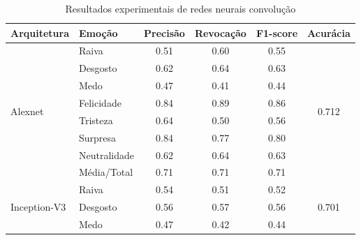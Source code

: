 \begin{table}[]
\centering
\caption{Resultados experimentais de redes neurais convolução}
\label{my-label}
\begin{tabular}{llcccc}
\hline
\textbf{Arquitetura}                & \textbf{Emoção}       & \textbf{Precisão} & \textbf{Revocação} & \textbf{F1-score} & \textbf{Acurácia}               \\ \hline
\multirow{8}{*}{Alexnet}            & Raiva                 & 0.51              & 0.60               & 0.55              & \multirow{8}{*}{0.712}          \\
                                    & Desgosto              & 0.62              & 0.64               & 0.63              &                                 \\
                                    & Medo                  & 0.47              & 0.41               & 0.44              &                                 \\
                                    & Felicidade            & 0.84              & 0.89               & 0.86              &                                 \\
                                    & Tristeza              & 0.64              & 0.50               & 0.56              &                                 \\
                                    & Surpresa              & 0.84              & 0.77               & 0.80              &                                 \\
                                    & Neutralidade          & 0.62              & 0.64               & 0.63              &                                 \\
                                    & Média/Total           & 0.71              & 0.71               & 0.71              &                                 \\ \hline
\multirow{8}{*}{Inception-V3}       & Raiva                 & 0.54              & 0.51               & 0.52              & \multirow{8}{*}{0.701}          \\
                                    & Desgosto              & 0.56              & 0.57               & 0.56              &                                 \\
                                    & Medo                  & 0.47              & 0.42               & 0.44              &                                 \\

\end{tabular}
\end{table}
